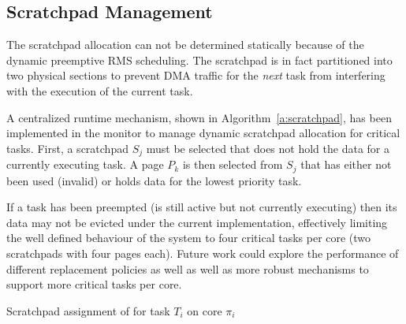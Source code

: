 % 

\subsection{Scratchpad Management}

	The scratchpad allocation can not be determined statically because of the dynamic preemptive RMS scheduling. 
	The scratchpad is in fact partitioned into two physical sections to prevent DMA traffic for the \emph{next} task from interfering with the execution of the current task. 
	
	A centralized runtime mechanism, shown in Algorithm~\ref{a:scratchpad}, has been implemented in the monitor to manage dynamic scratchpad allocation for critical tasks.
	First, a scratchpad $S_j$ must be selected that does not hold the data for a currently executing task. 
	A page $P_k$ is then selected from $S_j$ that has either not been used (invalid) or holds data for the lowest priority task.

	If a task has been preempted (is still active but not currently executing) then its data may not be evicted under the current implementation, effectively limiting the well defined behaviour of the system to four critical tasks per core (two scratchpads with four pages each).
	Future work could explore the performance of different replacement policies as well as well as more robust mechanisms to support more critical tasks per core.
	
\begin{algorithm}
\caption{Scratchpad assignment of for task $T_i$ on core $\pi_i$}
\label{a:scratchpad}
\end{algorithm}

